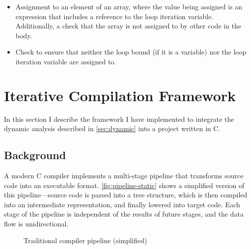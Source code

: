 \documentclass[journal]{IEEEtran}
\begin{document}
\begin{itemize}
  \item Assignment to an element of an array, where the value being assigned is
    an expression that includes a reference to the loop iteration variable.
    Additionally, a check that the array is not assigned to by other code in the
    body.
  \item Check to ensure that neither the loop bound (if it is a variable) nor
    the loop iteration variable are assigned to.
\end{itemize}

\section{Iterative Compilation Framework} \label{sec:iter}

In this section I describe the framework I have implemented to integrate the
dynamic analysis described in \autoref{sec:dynamic} into a project written in C.

\subsection{Background}

A modern C compiler implements a multi-stage pipeline that transforms source
code into an executable format. \autoref{fig:pipeline-static} shows a simplified
version of this pipeline---source code is parsed into a tree structure, which is
then compiled into an intermediate representation, and finally lowered into
target code. Each stage of the pipeline is independent of the results of future
stages, and the data flow is unidirectional.

\begin{figure}[h] 
  \centering 
  \caption{Traditional compiler pipeline (simplified)} 
  \label{fig:pipeline-static}
\end{figure}
\end{document}
